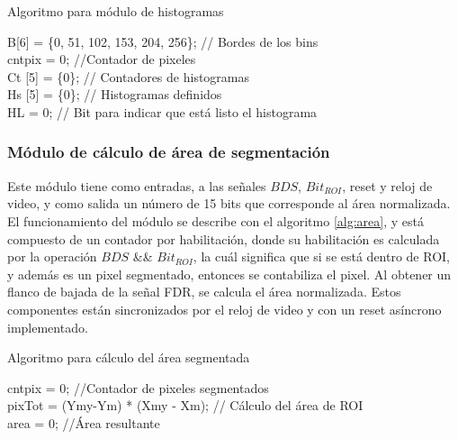\documentclass[twoside,spanish,ESP,MSc]{plantillaLabUPV}
\theoremstyle{definition}
\begin{document}
\begin{algorithm} %
	\caption{Algoritmo para módulo de histogramas}
	\label{alg:histo}
	\SetAlgoLined
	
	B[6] = \{0, 51, 102, 153, 204, 256\}; // Bordes de los bins \\
	cntpix = 0; //Contador de pixeles \\
	Ct [5] = \{0\}; // Contadores de histogramas \\
	Hs [5] = \{0\}; // Histogramas definidos \\
	HL = 0; // Bit para indicar que está listo el histograma\\ 
\end{algorithm}


\subsubsection{Módulo de cálculo de área de segmentación} \label{sec:areasgm}

Este módulo tiene como entradas, a las señales $BDS$, $Bit_{ROI}$, reset y reloj de video, y como salida un número de 15 bits que corresponde al área normalizada. El funcionamiento del módulo se describe con el algoritmo \ref{alg:area}, y está compuesto de un contador por habilitación, donde su habilitación es calculada por la operación $BDS$ \&\& $Bit_{ROI}$, la cuál significa que si se está dentro de ROI, y además es un pixel segmentado, entonces se contabiliza el pixel. Al obtener un flanco de bajada de la señal FDR, se calcula el área normalizada. Estos componentes están sincronizados por el reloj de video y con un reset asíncrono implementado.

\begin{algorithm} %
	\caption{Algoritmo para cálculo del área segmentada}
	\label{alg:area}
	\SetAlgoLined
	
	cntpix = 0; //Contador de pixeles segmentados \\
	pixTot = (Ymy-Ym) * (Xmy - Xm); // Cálculo del área de ROI\\
	area = 0; //Área resultante
	
\end{algorithm}
\end{document}
